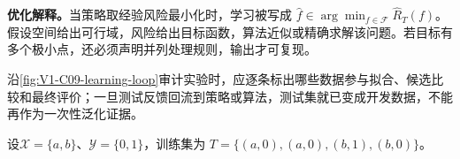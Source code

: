 \documentclass[UTF8,a4paper,11pt,openany]{ctexbook}
\begin{document}
\setcounter{page}{162}
\setcounter{chapter}{9}
\setcounter{figure}{0}
\pagestyle{headings}
\begin{optimizationbox}
\textbf{优化解释。}当策略取经验风险最小化时，学习被写成
$\widehat f\in\arg\min_{f\in\mathcal F}\widehat R_T(f)$。
假设空间给出可行域，风险给出目标函数，算法近似或精确求解该问题。若目标有多个极小点，还必须声明并列处理规则，输出才可复现。
\end{optimizationbox}

沿\cref{fig:V1-C09-learning-loop}审计实验时，应逐条标出哪些数据参与拟合、候选比较和最终评价；一旦测试反馈回流到策略或算法，测试集就已变成开发数据，不能再作为一次性泛化证据。
\begin{example}[两个候选分类规则的经验比较]
设$\mathcal X=\{a,b\}$、$\mathcal Y=\{0,1\}$，训练集为
$T=\{(a,0),(a,0),(b,1),(b,0)\}$。
\end{example}
\end{document}
